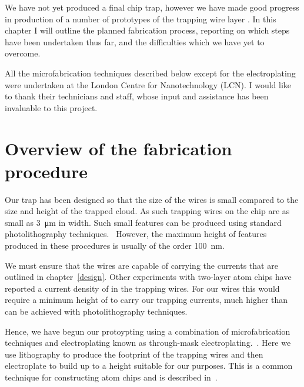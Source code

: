 We have not yet produced a final chip trap, however we have made good progress
in production of a number of prototypes of the trapping wire layer . In this chapter I will outline the
planned fabrication process, reporting on which steps have been undertaken thus
far, and the difficulties which we have yet to overcome.

All the microfabrication techniques described below except for the
electroplating were undertaken at the London Centre for Nanotechnology (LCN). I
would like to thank their technicians and staff, whose input and assistance has
been invaluable to this project.  

\section{Overview of the fabrication procedure}

Our trap has been designed so that the size of the wires is small compared to
the size and height of the trapped cloud. As such trapping wires on the chip
are as small as \SI{3}{\micro\meter} in width. Such small features can be
produced using standard photolithography techniques.~\cite{Madou2002} However,
the maximum height of features produced in these procedures is usually of the
order \SI{100}{\nano\meter}.

We must ensure that the wires are capable of carrying the currents that are
outlined in chapter~\ref{design}.  Other experiments with two-layer atom chips
have reported a current density of  in the trapping wires. For our wires
this would require a minimum height of  to carry our trapping
currents, much higher than can be achieved with photolithography techniques.

Hence, we have begun our protoypting using a combination of microfabrication
techniques and electroplating known as through-mask
electroplating.~\cite{Ruythooren_2000}. Here we use lithography to produce the
footprint of the trapping wires and then electroplate to build up to a height
suitable for our purposes. This is a common technique for constructing atom
chips and is described in~\cite{2011Ac, Lev2003, KOUKHARENKO2004600}.


